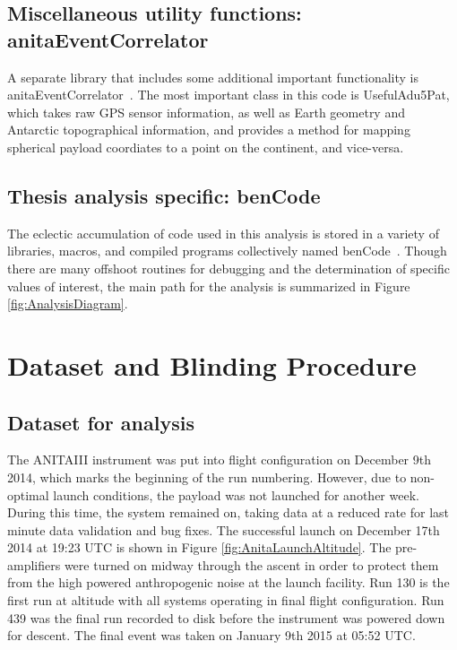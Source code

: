 	\subsection{Miscellaneous utility functions: anitaEventCorrelator}
		A separate library that includes some additional important functionality is anitaEventCorrelator~\cite{anitaEventCorrelator}.  The most important class in this code is UsefulAdu5Pat, which takes raw GPS sensor information, as well as Earth geometry and Antarctic topographical information, and provides a method for mapping spherical payload coordiates to a point on the continent, and vice-versa.
		
		
	\subsection{Thesis analysis specific: benCode}
		The eclectic accumulation of code used in this analysis is stored in a variety of libraries, macros, and compiled programs collectively named benCode~\cite{benCode}.  Though there are many offshoot routines for debugging and the determination of specific values of interest, the main path for the analysis is summarized in Figure \ref{fig:AnalysisDiagram}.

	
	
	
\section{Dataset and Blinding Procedure}
	
	\subsection{Dataset for analysis}
		The ANITAIII instrument was put into flight configuration on December 9th 2014, which marks the beginning of the run numbering.  However, due to non-optimal launch conditions, the payload was not launched for another week.  During this time, the system remained on, taking data at a reduced rate for last minute data validation and bug fixes.  The successful launch on December 17th 2014 at 19:23 UTC is shown in Figure \ref{fig:AnitaLaunchAltitude}.  The pre-amplifiers were turned on midway through the ascent in order to protect them from the high powered anthropogenic noise at the launch facility. Run 130 is the first run at altitude with all systems operating in final flight configuration.  Run 439 was the final run recorded to disk before the instrument was powered down for descent.  The final event was taken on January 9th 2015 at 05:52 UTC.
			
